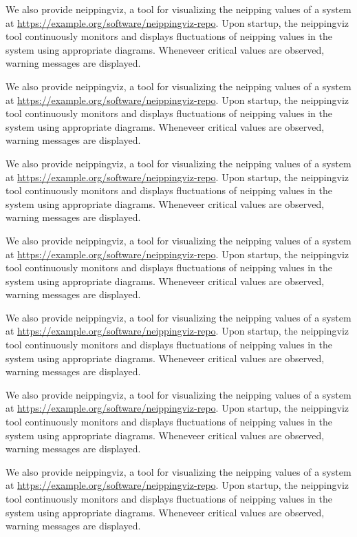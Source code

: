 We also provide neippingviz, a tool for visualizing the neipping values of a system at \url{https://example.org/software/neippingviz-repo}. Upon startup, the neippingviz tool continuously monitors and displays fluctuations of neipping values in the system using appropriate diagrams. Wheneveer critical values are observed, warning messages are displayed.

We also provide neippingviz, a tool for visualizing the neipping values of a system at \url{https://example.org/software/neippingviz-repo}. Upon startup, the neippingviz tool continuously monitors and displays fluctuations of neipping values in the system using appropriate diagrams. Wheneveer critical values are observed, warning messages are displayed.

We also provide neippingviz, a tool for visualizing the neipping values of a system at \url{https://example.org/software/neippingviz-repo}. Upon startup, the neippingviz tool continuously monitors and displays fluctuations of neipping values in the system using appropriate diagrams. Wheneveer critical values are observed, warning messages are displayed.

We also provide neippingviz, a tool for visualizing the neipping values of a system at \url{https://example.org/software/neippingviz-repo}. Upon startup, the neippingviz tool continuously monitors and displays fluctuations of neipping values in the system using appropriate diagrams. Wheneveer critical values are observed, warning messages are displayed.

We also provide neippingviz, a tool for visualizing the neipping values of a system at \url{https://example.org/software/neippingviz-repo}. Upon startup, the neippingviz tool continuously monitors and displays fluctuations of neipping values in the system using appropriate diagrams. Wheneveer critical values are observed, warning messages are displayed.

We also provide neippingviz, a tool for visualizing the neipping values of a system at \url{https://example.org/software/neippingviz-repo}. Upon startup, the neippingviz tool continuously monitors and displays fluctuations of neipping values in the system using appropriate diagrams. Wheneveer critical values are observed, warning messages are displayed.

We also provide neippingviz, a tool for visualizing the neipping values of a system at \url{https://example.org/software/neippingviz-repo}. Upon startup, the neippingviz tool continuously monitors and displays fluctuations of neipping values in the system using appropriate diagrams. Wheneveer critical values are observed, warning messages are displayed.






